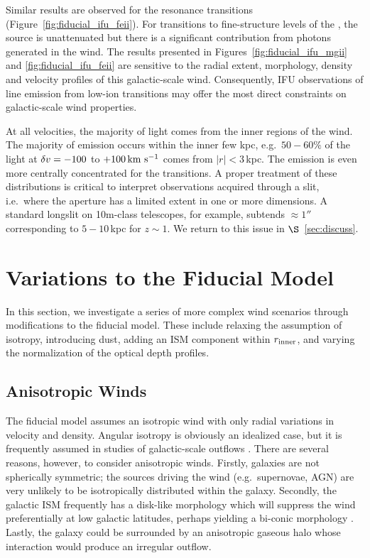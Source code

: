 \documentclass[12pt,preprint]{aastex}
\begin{document}
Similar results are observed for the  resonance
transitions (Figure~\ref{fig:fiducial_ifu_feii}).
For transitions to fine-structure levels of the \aconfig, the source
is unattenuated but there is a significant contribution from photons
generated in the wind. 
The results presented in Figures~\ref{fig:fiducial_ifu_mgii} and
\ref{fig:fiducial_ifu_feii} are sensitive to the radial extent,
morphology, density and velocity profiles of this galactic-scale
wind.  Consequently, IFU observations of line emission from low-ion
transitions may offer the most direct constraints on galactic-scale
wind properties. 

At all velocities, the majority of light comes from the inner regions
of the wind. 
The majority of
 emission occurs within the inner few kpc, e.g.\ $50-60\%$
of the light at $\delta v=-100$ to $+100 \, {\rm km~s^{-1}}$
comes from $|r| < 3$\,kpc.
The emission
is even more centrally concentrated for the  transitions.
A proper treatment of these
distributions is critical to interpret observations
acquired through a slit, i.e.\ where the aperture has a limited extent
in one or more dimensions.  A standard longslit on 10m-class
telescopes, for example, subtends $\approx 1''$ corresponding to
$5-10$\,kpc for $z \sim 1$.    We return to this issue in
$\S$~\ref{sec:discuss}. 


\section{Variations to the Fiducial Model}
\label{sec:variants}

In this section, we investigate a series of more complex wind
scenarios
through modifications to the fiducial model.  These include relaxing
the assumption of isotropy, introducing dust, adding an ISM
component within $r_{\rm inner}$, and varying the normalization of the
optical depth profiles.

\subsection{Anisotropic Winds}
\label{sec:anisotropic}

The fiducial model assumes an
isotropic wind with only radial variations in velocity and density. 
Angular isotropy is obviously an idealized case, but
it is frequently assumed in studies of galactic-scale outflows
\citep[e.g.][]{steidel+10}.   There are several reasons, however, to
consider anisotropic winds.  Firstly, galaxies are not spherically
symmetric;  the sources driving the
wind (e.g.\ supernovae, AGN) are very unlikely to be isotropically distributed
within the galaxy.  
Secondly, the galactic ISM frequently has a disk-like morphology
which will suppress the wind preferentially at low galactic latitudes,
perhaps yielding a bi-conic morphology \citep[e.g.][]{ham90,wws02}.
Lastly, the galaxy could be surrounded by an
anisotropic gaseous halo whose interaction would produce an irregular 
outflow.
\end{document}
